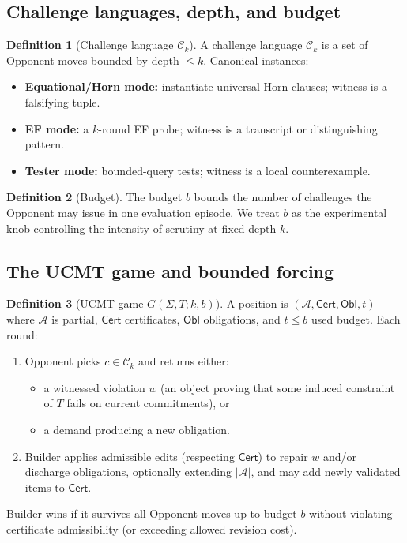 \documentclass[11pt]{article}
\theoremstyle{definition}
\newtheorem{definition}{Definition}[section]
\theoremstyle{plain}
\newcommand{\Sig}{\Sigma}
\newcommand{\Thy}{T}
\newcommand{\Struct}{\mathcal{A}}
\newcommand{\Univ}{\left|\Struct\right|}
\newcommand{\Cert}{\mathsf{Cert}}
\newcommand{\Obl}{\mathsf{Obl}}
\begin{document}
\subsection{Challenge languages, depth, and budget}

\begin{definition}[Challenge language $\mathcal{C}_k$]
A challenge language $\mathcal{C}_k$ is a set of Opponent moves bounded by depth $\le k$.
Canonical instances:
\begin{itemize}[leftmargin=1.5em]
\item \textbf{Equational/Horn mode:} instantiate universal Horn clauses; witness is a falsifying tuple.
\item \textbf{EF mode:} a $k$-round EF probe; witness is a transcript or distinguishing pattern.
\item \textbf{Tester mode:} bounded-query tests; witness is a local counterexample.
\end{itemize}
\end{definition}

\begin{definition}[Budget]
The budget $b$ bounds the number of challenges the Opponent may issue in one evaluation episode.
We treat $b$ as the experimental knob controlling the intensity of scrutiny at fixed depth $k$.
\end{definition}

\subsection{The UCMT game and bounded forcing}

\begin{definition}[UCMT game $G(\Sig,\Thy;k,b)$]
A position is $(\Struct,\Cert,\Obl,t)$ where $\Struct$ is partial, $\Cert$ certificates, $\Obl$ obligations, and $t\le b$ used budget.
Each round:
\begin{enumerate}[leftmargin=1.5em]
\item Opponent picks $c\in\mathcal{C}_k$ and returns either:
  \begin{itemize}[leftmargin=1.5em]
  \item a witnessed violation $w$ (an object proving that some induced constraint of $\Thy$ fails on current commitments), or
  \item a demand producing a new obligation.
  \end{itemize}
\item Builder applies admissible edits (respecting $\Cert$) to repair $w$ and/or discharge obligations,
      optionally extending $\Univ$, and may add newly validated items to $\Cert$.
\end{enumerate}
Builder wins if it survives all Opponent moves up to budget $b$ without violating certificate admissibility
(or exceeding allowed revision cost).
\end{definition}
\end{document}
